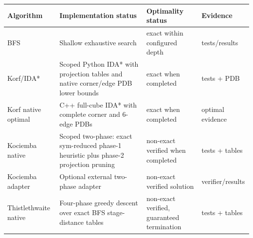 {\small
\begin{tabular}{L{0.17\textwidth}L{0.29\textwidth}L{0.25\textwidth}L{0.17\textwidth}}
\hline
Algorithm & Implementation status & Optimality status & Evidence \\
\hline
BFS & Shallow exhaustive search & exact within configured depth & tests/results \\
Korf/IDA* & Scoped Python IDA* with projection tables and native corner/edge PDB lower bounds & exact when completed & tests + PDB \\
Korf native optimal & C++ full-cube IDA* with complete corner and 6-edge PDBs & exact when completed & optimal evidence \\
Kociemba native & Scoped two-phase: exact sym-reduced phase-1 heuristic plus phase-2 projection pruning & non-exact verified when completed & tests + tables \\
Kociemba adapter & Optional external two-phase adapter & non-exact verified solution & verifier/results \\
Thistlethwaite native & Four-phase greedy descent over exact BFS stage-distance tables & non-exact verified, guaranteed termination & tests + tables \\
\hline
\end{tabular}
}
